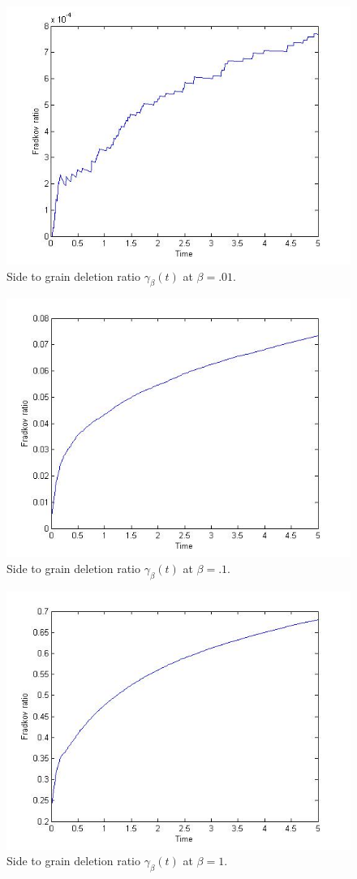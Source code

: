         
\begin{figure}
\centering
        \includegraphics[width=.5\textwidth]{coarseratiobetazero.jpg}
        \caption{Side to grain deletion ratio $\gamma_\beta(t)$ at $\beta=.01$.}\label{fradrat1}
 \end{figure}
       
 \begin{figure}
        \centering
        \includegraphics[width=.5\textwidth]{coarseratiobetatenth.jpg}
        \caption{Side to grain deletion ratio $\gamma_\beta(t)$ at $\beta=.1$.}
 \end{figure}       
        
        \begin{figure}
        \centering
        \includegraphics[width=.5\textwidth]{coarseratiobetaone.jpg}
        \caption{Side to grain deletion ratio $\gamma_\beta(t)$ at $\beta=1$.}\label{fradrat3}
       \end{figure}

\clearpage{}

 




